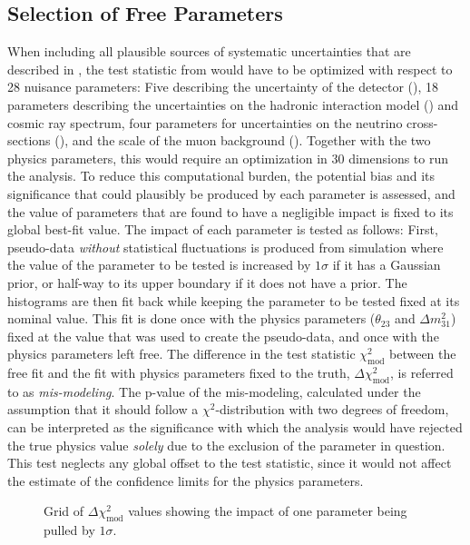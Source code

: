 \subsection{Selection of Free Parameters}
\label{sec:std-osc-free-parameters}

When including all plausible sources of systematic uncertainties that are described in , the test statistic from  would have to be optimized with respect to 28 nuisance parameters: Five describing the uncertainty of the detector (), 18 parameters describing the uncertainties on the hadronic interaction model () and cosmic ray spectrum, four parameters for uncertainties on the neutrino cross-sections (), and the scale of the muon background (). Together with the two physics parameters, this would require an optimization in 30 dimensions to run the analysis. To reduce this computational burden, the potential bias and its significance that could plausibly be produced by each parameter is assessed, and the value of parameters that are found to have a negligible impact is fixed to its global best-fit value. The impact of each parameter is tested as follows: First, pseudo-data \emph{without} statistical fluctuations is produced from simulation where the value of the parameter to be tested is increased by $1\sigma$ if it has a Gaussian prior, or half-way to its upper boundary if it does not have a prior. The histograms are then fit back while keeping the parameter to be tested fixed at its nominal value. This fit is done once with the physics parameters ($\theta_{23}$ and $\Delta m^2_{31}$) fixed at the value that was used to create the pseudo-data, and once with the physics parameters left free. The difference in the test statistic $\chi^2_{\mathrm{mod}}$ between the free fit and the fit with physics parameters fixed to the truth, $\Delta \chi^2_{\mathrm{mod}}$, is referred to as \emph{mis-modeling}. The p-value of the mis-modeling, calculated under the assumption that it should follow a $\chi^2$-distribution with two degrees of freedom, can be interpreted as the significance with which the analysis would have rejected the true physics value \emph{solely} due to the exclusion of the parameter in question. This test neglects any global offset to the test statistic, since it would not affect the estimate of the confidence limits for the physics parameters.
\begin{figure}
    \centering
    \caption{Grid of $\Delta \chi^2_{\mathrm{mod}}$ values showing the impact of one parameter being pulled by $1\sigma$.}
    \label{fig:systematic-impact-mismod-example}
\end{figure}
